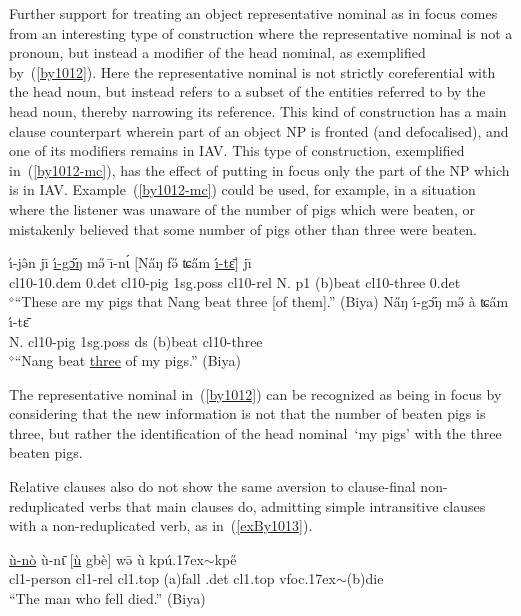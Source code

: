\documentclass[10pt,twoside]{article}
\makeatletter
\newcommand{\gl}[1]{`#1'}
\newcommand{\cl}[1]{{\sc cl#1}}
\newcommand{\pref}[1]{(\ref{#1})}
\newcommand{\sref}[1]{Section \ref{#1}}
\def\elicited{$^\diamond$}
\def\til{\raise.17ex\hbox{$\scriptstyle\mathtt{\sim}$}}	%
\renewcommand{\i}{ı}
\def\@{ə}
\def\eh{ɛ}
\def\aw{ɔ}
\def\ih{ɩ}
\def\ng{ŋ}
\def\tch{ʨ}
\makeatother
\begin{document}
Further support for treating an object representative nominal as
in focus comes from an interesting type of construction where 
the representative nominal is not a pronoun, but instead
a modifier of the head nominal, as exemplified
by~\pref{by1012}.
Here the representative nominal
is not strictly coreferential with
the head noun, but instead refers to a subset of the entities referred to by
the head noun, thereby narrowing its reference. This kind
of construction has a main clause counterpart wherein part of
an object NP is fronted (and defocalised), and one of its modifiers remains in IAV.
This type of construction, exemplified in~\pref{by1012-mc}, has
the effect of putting in focus only the part of the NP which is in IAV.
Example~\pref{by1012-mc} could be used, for example, in a situation where
the listener was unaware of the number of pigs which were beaten, or mistakenly
believed that some number of pigs other than three were beaten.
%
\begin{exe}
\ex \label{by1012}
\gll \'\i-j\^{\@}n j\={\i} \uline{\'\i-g\H{\aw}{\ng}} m\H{\@} \=\i-n\'{\ih} $[$N\H{a}{\ng} f\H{\@} \tch\H{a}m \uline{\'\i-t\={\eh}}$]$ j\={\i}	\\
\cl10-{\sc 10.dem} {\sc \cl10.det} \cl10-pig {\sc 1sg.poss} \cl10-{\sc rel} N.
{\sc p1} ({\sc b})beat \cl10-three {\sc \cl10.det} 	\\
\glt \elicited``These are my pigs that Nang beat three [of them].'' (Biya) %
\ex \label{by1012-mc}
\gll N\H{a}{\ng}  {\'\i-g\H{\aw}{\ng}} m\H{\@} \`a \tch\H{a}m \'\i-t\={\eh}	\\
N. \cl10-pig {\sc 1sg.poss} {\sc ds} ({\sc b})beat \cl10-three	\\
\glt \elicited``Nang beat \uline{three} of my pigs.'' (Biya) %
\end{exe}
%

The representative nominal in~\pref{by1012} can be
recognized as being in focus
by considering that the
new information is not that the number of beaten pigs is three, but rather
the identification of the head nominal~\gl{my pigs} with the three
beaten pigs.

Relative clauses also do not show the same aversion to clause-final
non-reduplicated verbs that main clauses do, admitting simple
intransitive clauses with a non-reduplicated verb, as in~\pref{exBy1013}.
\begin{exe}
\ex	\label{exBy1013}
\gll \uline{\`u-n\`o} \`u-n\={\ih} $[$\uline{\`u} gb\`e$]$ w\={\@} \`u kp\'u\til{kp\H{e}}	\\
\cl1-person \cl1-{\sc rel} \cl1.{\sc top} ({\sc a})fall {\sc \cl1.det} \cl1.{\sc top} {\sc vfoc}\til{({\sc b})die}	\\
\glt ``The man who fell died.'' (Biya)	%
\end{exe}
\end{document}

